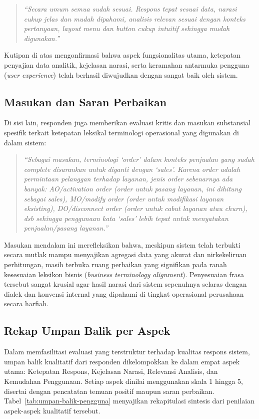 \begin{quote}
\textit{``Secara umum semua sudah sesuai. Respons tepat sesuai data, narasi cukup jelas dan mudah dipahami, analisis relevan sesuai dengan konteks pertanyaan, layout menu dan button cukup intuitif sehingga mudah digunakan.''}
\end{quote}

Kutipan di atas mengonfirmasi bahwa aspek fungsionalitas utama, ketepatan penyajian data analitik, kejelasan narasi, serta keramahan antarmuka pengguna (\textit{user experience}) telah berhasil diwujudkan dengan sangat baik oleh sistem.

\subsection{Masukan dan Saran Perbaikan}

Di sisi lain, responden juga memberikan evaluasi kritis dan masukan substansial spesifik terkait ketepatan leksikal terminologi operasional yang digunakan di dalam sistem:

\begin{quote}
\textit{``Sebagai masukan, terminologi `order' dalam konteks penjualan yang sudah complete disarankan untuk diganti dengan `sales'. Karena order adalah permintaan pelanggan terhadap layanan, jenis order sebenarnya ada banyak: AO/activation order (order untuk pasang layanan, ini dihitung sebagai sales), MO/modify order (order untuk modifikasi layanan eksisting), DO/disconnect order (order untuk cabut layanan atau churn), dsb sehingga penggunaan kata `sales' lebih tepat untuk menyatakan penjualan/pasang layanan.''}
\end{quote}

Masukan mendalam ini merefleksikan bahwa, meskipun sistem telah terbukti secara mutlak mampu menyajikan agregasi data yang akurat dan nirkekeliruan perhitungan, masih terbuka ruang perbaikan yang signifikan pada ranah kesesuaian leksikon bisnis (\textit{business terminology alignment}). Penyesuaian frasa tersebut sangat krusial agar hasil narasi dari sistem sepenuhnya selaras dengan dialek dan konvensi internal yang dipahami di tingkat operasional perusahaan secara harfiah.

\subsection{Rekap Umpan Balik per Aspek}

Dalam memfasilitasi evaluasi yang ter\-struk\-tur ter\-ha\-dap kua\-li\-tas res\-pons sis\-tem, um\-pan ba\-lik kualitatif dari responden dikelompokkan ke dalam empat aspek utama: Ketepatan Respons, Kejelasan Narasi, Relevansi Analisis, dan Kemudahan Penggunaan. Setiap aspek dinilai menggunakan skala 1 hingga 5, disertai dengan pencatatan temuan positif maupun saran perbaikan. Tabel~\ref{tab:umpan-balik-pengguna} menyajikan rekapitulasi sintesis dari penilaian aspek-aspek kualitatif tersebut.

